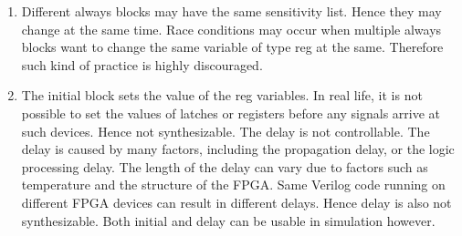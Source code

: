 \documentclass[11pt,letterpaper,titlepage]{article}
\begin{document}
\begin{enumerate}
\begin{enumerate}
        \item Different always blocks may have the same sensitivity list. Hence they may change at the same time. Race conditions may occur when multiple always blocks want to change the same variable of type reg at the same. Therefore such kind of practice is highly discouraged.
        
        \item The initial block sets the value of the reg variables. In real life, it is not possible to set the values of latches or registers before any signals arrive at such devices. Hence not synthesizable. The delay is not controllable. The delay is caused by many factors, including the propagation delay, or the logic processing delay. The length of the delay can vary due to factors such as temperature and the structure of the FPGA. Same Verilog code running on different FPGA devices can result in different delays. Hence delay is also not synthesizable. Both initial and delay can be usable in simulation however.
        
    \end{enumerate}
    
\end{enumerate}
\end{document}
